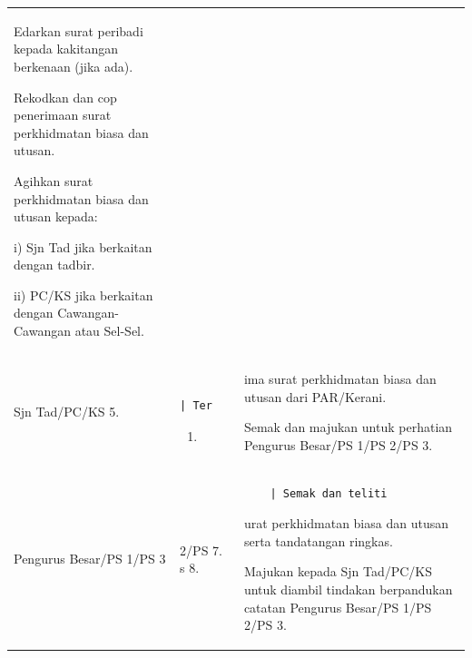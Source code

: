 \documentclass[
]{article}
\begin{document}
\begin{longtable}[]{@{}lll@{}}
\begin{minipage}[t]{0.30\columnwidth}
Edarkan surat peribadi kepada kakitangan berkenaan (jika ada).

Rekodkan dan cop penerimaan surat perkhidmatan biasa dan utusan.

Agihkan surat perkhidmatan biasa dan utusan kepada:

i) Sjn Tad jika berkaitan dengan tadbir.

ii) PC/KS jika berkaitan dengan Cawangan- Cawangan atau Sel-Sel.\strut
\end{minipage}\tabularnewline
\begin{minipage}[t]{0.30\columnwidth}\raggedright
Sjn Tad/PC/KS \textbar{} 5.\strut
\end{minipage} & \begin{minipage}[t]{0.30\columnwidth}\raggedright
\begin{verbatim}
              | Ter
\end{verbatim}

\begin{enumerate}
\def\labelenumi{\arabic{enumi}.}
\setcounter{enumi}{5}
\item
\end{enumerate}\strut
\end{minipage} & \begin{minipage}[t]{0.30\columnwidth}\raggedright
ima surat perkhidmatan biasa dan utusan dari PAR/Kerani.

Semak dan majukan untuk perhatian Pengurus Besar/PS 1/PS 2/PS 3.\strut
\end{minipage}\tabularnewline
\begin{minipage}[t]{0.30\columnwidth}\raggedright
Pengurus Besar/PS 1/PS 3 \textbar{}\strut
\end{minipage} & \begin{minipage}[t]{0.30\columnwidth}\raggedright
2/PS \textbar{} 7. \textbar{} s 8.\strut
\end{minipage} & \begin{minipage}[t]{0.30\columnwidth}\raggedright
\begin{verbatim}
    | Semak dan teliti
\end{verbatim}

urat perkhidmatan biasa dan utusan serta tandatangan ringkas.

Majukan kepada Sjn Tad/PC/KS untuk diambil tindakan berpandukan catatan
Pengurus Besar/PS 1/PS 2/PS 3.\strut
\end{minipage}\tabularnewline
\bottomrule
\end{longtable}
\end{document}

